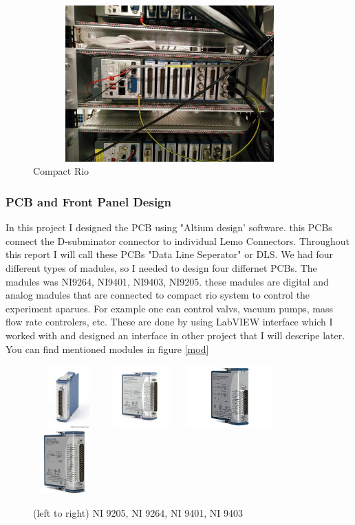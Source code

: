 \documentclass[12pt,a4paper]{article}
\begin{document}
\begin{figure}[h]
\centering
\includegraphics[width=105mm, height=60mm]{crio}
\caption{Compact Rio}
\label{crio}
\end{figure}

\subsubsection{PCB and Front Panel Design}
In this project I designed the PCB using "Altium design' software. this PCBs connect the D-subminator connector to individual Lemo Connectors. Throughout this report I will call these PCBs "Data Line Seperator" or DLS. We had four different types of madules, so I needed to design four differnet PCBs.
The madules was NI9264, NI9401, NI9403, NI9205. these madules are digital and analog madules that are connected to compact rio system to control the experiment aparues. For example one can control valvs, vacuum pumps, mass flow rate controlers, etc. These are done by using LabVIEW interface which I worked with and designed an interface in other project that  I will descripe later. You can find mentioned modules in figure \ref{mod}

\begin{figure}
\centering
\includegraphics[width=27mm, height=24mm]{ni9205}
\includegraphics[width=27mm, height=24mm]{ni9264}
\includegraphics[width=38mm, height=24mm]{ni9401}
\includegraphics[width=24mm, height=24mm]{ni9403}
\caption{(left to right) NI 9205, NI 9264, NI 9401, NI 9403}
\end{figure}
\end{document}
